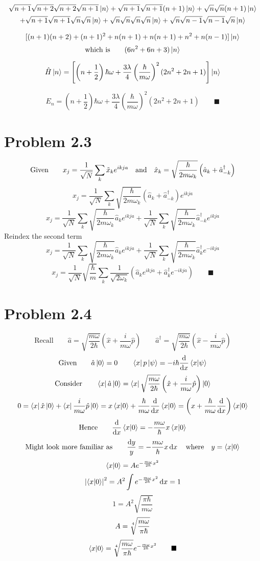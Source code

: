 \documentclass{amsart}
\begin{document}
\begin{multline*}
\sqrt{n+1}\sqrt{n+2}\sqrt{n+2}\sqrt{n+1}\ket{n}+\sqrt{n+1}\sqrt{n+1}(n+1)\ket{n}+\sqrt{n}\sqrt{n}(n+1)\ket{n}\\+\sqrt{n+1}\sqrt{n+1}\sqrt{n}\sqrt{n}\ket{n}+\sqrt{n}\sqrt{n}\sqrt{n}\sqrt{n}\ket{n}+\sqrt{n}\sqrt{n-1}\sqrt{n-1}\sqrt{n}\ket{n}
\end{multline*}

\[[(n+1)(n+2)+(n+1)^2+n(n+1)+n(n+1)+n^2+n(n-1)]\ket{n}\]
\[\text{which is}\qquad(6n^2+6n+3)\ket{n}\]

\[\hat{H}\ket{n}=\left[\left(n+\frac{1}{2}\right)\hbar\omega+\frac{3\lambda}{4}\left(\frac{\hbar}{m\omega}\right)^2(2n^2+2n+1)\right]\ket{n}\]

\[E_n=\left(n+\frac{1}{2}\right)\hbar\omega+\frac{3\lambda}{4}\left(\frac{\hbar}{m\omega}\right)^2(2n^2+2n+1)\qquad\blacksquare\]

\section*{Problem 2.3}
\[\text{Given}\qquad x_j=\frac{1}{\sqrt{N}}\sum_k \tilde{x}_k e^{ikja}\qq{and} \hat{x}_k=\sqrt{\frac{\hbar}{2m\omega_k}}\left(\hat{a}_k+\hat{a}^\dagger_{-k}\right)\]
\[x_j=\frac{1}{\sqrt{N}}\sum_k \sqrt{\frac{\hbar}{2m\omega_k}}\left(\hat{a}_k+\hat{a}^\dagger_{-k}\right) e^{ikja}\]
\[x_j=\frac{1}{\sqrt{N}}\sum_k \sqrt{\frac{\hbar}{2m\omega_k}}\hat{a}_k e^{ikja}+\frac{1}{\sqrt{N}}\sum_k \sqrt{\frac{\hbar}{2m\omega_k}}\hat{a}^\dagger_{-k} e^{ikja}\]
Reindex the second term
\[x_j=\frac{1}{\sqrt{N}}\sum_k \sqrt{\frac{\hbar}{2m\omega_k}}\hat{a}_k e^{ikja}+\frac{1}{\sqrt{N}}\sum_k \sqrt{\frac{\hbar}{2m\omega_{k}}}\hat{a}^\dagger_{k} e^{-ikja}\]
\[x_j=\frac{1}{\sqrt{N}}\sqrt{\frac{\hbar}{m}}\sum_k \frac{1}{\sqrt{2\omega_k}}\left(\hat{a}_k e^{ikja}+\hat{a}^\dagger_{k} e^{-ikja}\right)\qquad\blacksquare\]


\section*{Problem 2.4}
\[\text{Recall}\qquad\hat{a}  = \sqrt{\frac{m\omega}{2\hbar}}\left(\hat{x} + \frac{i}{m\omega}\hat{p}\right) \qquad\hat{a}^\dagger  = \sqrt{\frac{m\omega}{2\hbar}}\left(\hat{x} - \frac{i}{m\omega}\hat{p}\right)\]
\[\text{Given}\qquad\hat{a}\ket{0}=0\qquad\bra{x}p\ket{\psi} = -i\hbar \dv{x}\bra{x}\ket{\psi}\]
\[\text{Consider}\qquad\bra{x}\hat{a}\ket{0}= \bra{x}\sqrt{\frac{m\omega}{2\hbar}}\left(\hat{x} + \frac{i}{m\omega}\hat{p}\right)\ket{0}\]
\[0= \bra{x}\hat{x}\ket{0} + \bra{x}\frac{i}{m\omega}\hat{p}\ket{0}=x\bra{x}\ket{0}+\frac{\hbar}{m\omega}\dv{x}\bra{x}\ket{0}=\left(x+\frac{\hbar}{m\omega}\dv{x}\right)\bra{x}\ket{0}\]
\[\text{Hence}\qquad\dv{x}\bra{x}\ket{0}=-\frac{m\omega}{\hbar}x\bra{x}\ket{0}\]
\[\text{Might look more familiar as}\qquad\frac{\dd{y}}{y}=-\frac{m\omega}{\hbar}x\dd{x}\qq{where}y=\bra{x}\ket{0}\]
\[\bra{x}\ket{0}=Ae^{-\frac{m\omega}{2\hbar}x^2}\]
\[\abs{\bra{x}\ket{0}}^2=A^2\int e^{-\frac{m\omega}{2\hbar}x^2}\dd{x}=1\]
\[1=A^2\sqrt{\frac{\pi\hbar}{m\omega}}\]
\[A=\sqrt[\uproot{2}4]{\frac{m\omega}{\pi\hbar}}\]
\[\bra{x}\ket{0}=\sqrt[\uproot{2}4]{\frac{m\omega}{\pi\hbar}}e^{-\frac{m\omega}{2\hbar}x^2}\qquad\blacksquare\]
\end{document}
